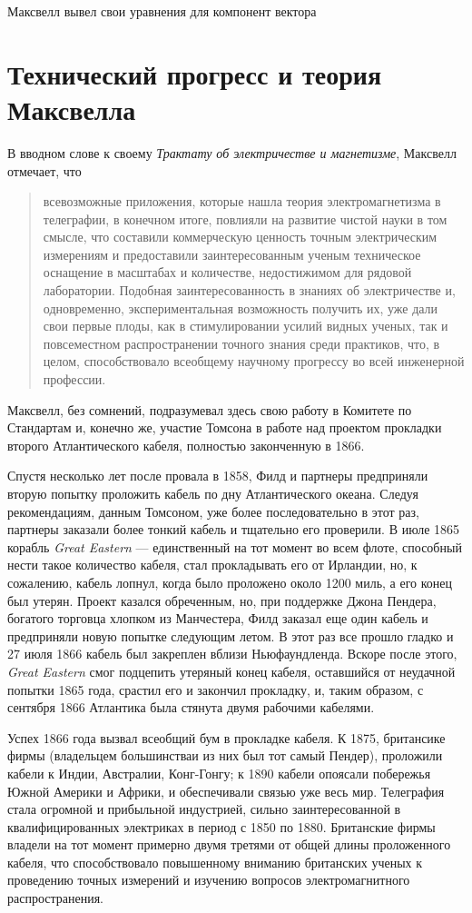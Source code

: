 \documentclass[12pt, oneside, a4paper]{article}
\begin{document}
Максвелл вывел свои уравнения для компонент вектора
\section*{Технический прогресс и теория Максвелла}
В вводном слове к своему \emph{Трактату об электричестве и магнетизме}, Максвелл отмечает, что 
\begin{quote}
\small
всевозможные приложения, которые нашла теория электромагнетизма в телеграфии, в конечном итоге, повлияли на развитие чистой науки в том смысле, что составили коммерческую ценность точным электрическим измерениям и предоставили заинтересованным ученым техническое оснащение в масштабах и количестве, недостижимом для рядовой лаборатории. Подобная заинтересованность в знаниях об электричестве и, одновременно, экспериментальная возможность получить их, уже дали свои первые плоды, как в стимулировании усилий видных ученых, так и повсеместном распространении точного знания среди практиков, что, в целом, способствовало  всеобщему научному прогрессу во всей инженерной профессии.
\end{quote}
Максвелл, без сомнений, подразумевал здесь свою работу в Комитете по Стандартам и, конечно же, участие Томсона в работе над проектом прокладки второго Атлантического кабеля, полностью законченную в 1866.

Спустя несколько лет после провала в 1858, Филд и партнеры предприняли вторую попытку проложить кабель по дну Атлантического океана. Следуя рекомендациям, данным Томсоном, уже более последовательно в этот раз, партнеры заказали более тонкий кабель и тщательно его проверили. В июле 1865 корабль \emph{Great Eastern} --- единственный на тот момент во всем флоте, способный нести такое количество кабеля, стал прокладывать его от Ирландии, но, к сожалению, кабель лопнул, когда было проложено около 1200 миль, а его конец был утерян. Проект казался обреченным, но, при поддержке Джона Пендера, богатого торговца хлопком из Манчестера, Филд заказал еще один кабель и предприняли новую попытке следующим летом. В этот раз все прошло гладко и 27 июля 1866 кабель был закреплен вблизи Ньюфаундленда. Вскоре после этого, \emph{Great Eastern} смог подцепить утеряный конец кабеля, оставшийся от неудачной попытки 1865 года, срастил его и закончил прокладку, и, таким образом, с сентября 1866 Атлантика была стянута двумя рабочими кабелями.

Успех 1866 года вызвал всеобщий бум в прокладке кабеля. К 1875, британсике фирмы (владельцем большинстваи из них был тот самый Пендер), проложили кабели к Индии, Австралии, Конг-Гонгу; к 1890 кабели опоясали побережья Южной Америки и Африки, и обеспечивали связью уже весь мир. Телеграфия стала огромной и прибыльной индустрией, сильно заинтересованной в квалифицированных электриках в период с 1850 по 1880. Британские фирмы владели на тот момент примерно двумя третями от общей длины проложенного кабеля, что способствовало повышенному вниманию британских ученых к проведению точных измерений и изучению вопросов электромагнитного распространения.
\end{document}
